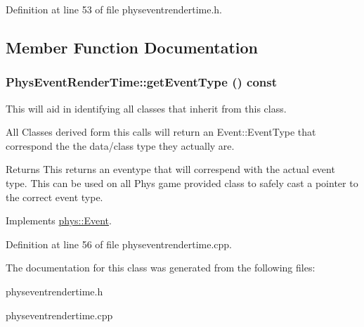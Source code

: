 Definition at line 53 of file physeventrendertime.h.



\subsection{Member Function Documentation}
\hypertarget{classPhysEventRenderTime_a96b0569f8b1cd459383318c9437130d4}{
\subsubsection[{getEventType}]{ PhysEventRenderTime::getEventType () const}}
\label{d4/d83/classPhysEventRenderTime_a96b0569f8b1cd459383318c9437130d4}


This will aid in identifying all classes that inherit from this class. 

All Classes derived form this calls will return an Event::EventType that correspond the the data/class type they actually are. \begin{DoxyReturn}{Returns}
This returns an eventype that will correspend with the actual event type. This can be used on all Phys game provided class to safely cast a pointer to the correct event type. 
\end{DoxyReturn}


Implements \hyperlink{classphys_1_1Event_ac2c0623a6bc399e62f4b9fb2c022ea73}{phys::Event}.



Definition at line 56 of file physeventrendertime.cpp.



The documentation for this class was generated from the following files:\begin{DoxyCompactItemize}
\item 
physeventrendertime.h\item 
physeventrendertime.cpp\end{DoxyCompactItemize}
